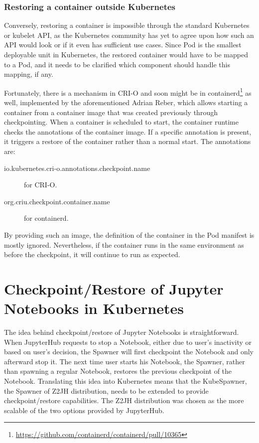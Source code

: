 \documentclass[
  digital,     %
  oneside,     %
  nosansbold,  %
  nocolorbold, %
  lof,         %
  nolot,         %
]{fithesis4}
\begin{document}
\subsection{Restoring a container outside Kubernetes}
\label{subsec:restoring}
Conversely, restoring a container is impossible through the standard Kubernetes or kubelet API, as the Kubernetes community has yet to agree upon how such an API would look or if it even has sufficient use cases. Since Pod is the smallest deployable unit in Kubernetes, the restored container would have to be mapped to a Pod, and it needs to be clarified which component should handle this mapping, if any.

Fortunately, there is a mechanism in CRI-O and soon might be in containerd\footnote{\url{https://github.com/containerd/containerd/pull/10365}} as well, implemented by the aforementioned Adrian Reber, which allows starting a container from a container image that was created previously through checkpointing. When a container is scheduled to start, the container runtime checks the annotations of the container image. If a specific annotation is present, it triggers a restore of the container rather than a normal start. The annotations are:
\begin{description}
    \item[io.kubernetes.cri-o.annotations.checkpoint.name] for CRI-O.
    \item[org.criu.checkpoint.container.name] for containerd.
\end{description}

By providing such an image, the definition of the container in the Pod manifest is mostly ignored. Nevertheless, if the container runs in the same environment as before the checkpoint, it will continue to run as expected.


\chapter{Checkpoint/Restore of Jupyter Notebooks in Kubernetes}
The idea behind checkpoint/restore of Jupyter Notebooks is straightforward. When JupyterHub requests to stop a Notebook, either due to user's inactivity or based on user's decision, the Spawner will first checkpoint the Notebook and only afterward stop it. The next time user starts his Notebook, the Spawner, rather than spawning a regular Notebook, restores the previous checkpoint of the Notebook. Translating this idea into Kubernetes means that the KubeSpawner, the Spawner of Z2JH distribution, needs to be extended to provide checkpoint/restore capabilities. The Z2JH distribution was chosen as the more scalable of the two options provided by JupyterHub.
\end{document}

